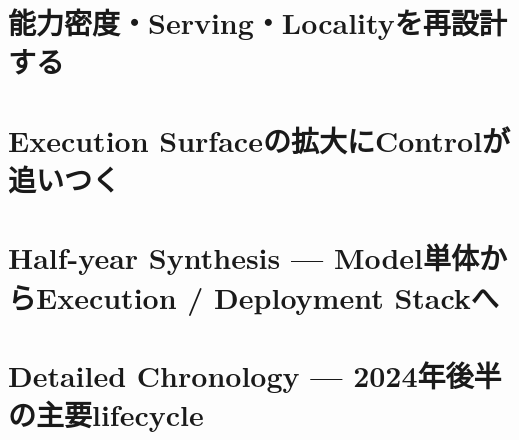 \documentclass[lualatex,a4paper,11pt]{jlreq}
\begin{document}
\Needspace{0.45\textheight}
\bigskip
\section{能力密度・Serving・Localityを再設計する}
\label{pkg:efficiency-serving}
\vspace{0.15em}

\vspace{0.20em}
\begin{multicols}{2}

\end{multicols}

\medskip


\Needspace{0.45\textheight}
\bigskip
\section{Execution Surfaceの拡大にControlが追いつく}
\label{pkg:control-evaluation}
\vspace{0.15em}

\vspace{0.20em}
\begin{multicols}{2}

\end{multicols}

\medskip


\Needspace{0.45\textheight}
\bigskip
\section{Half-year Synthesis — Model単体からExecution / Deployment Stackへ}
\label{pkg:synthesis}
\vspace{0.15em}

\vspace{0.20em}
\begin{multicols}{2}

\end{multicols}

\medskip


\Needspace{0.45\textheight}
\bigskip
\section{Detailed Chronology — 2024年後半の主要lifecycle}
\label{pkg:chronology}
\vspace{0.15em}

\vspace{0.20em}
\begin{multicols}{2}

\end{multicols}

\medskip


\Needspace{0.30\textheight}
\bigskip
\printbibliography[title={References / Source Notes}]
\end{document}

